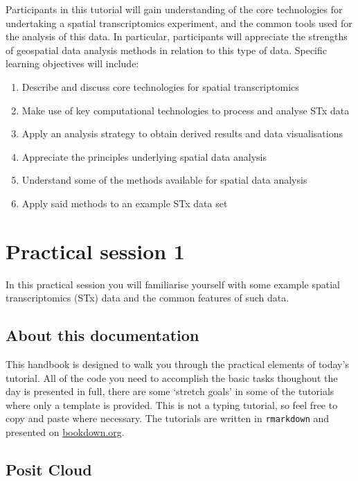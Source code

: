 \documentclass[
]{book}
\providecommand{\tightlist}{%
  \setlength{\itemsep}{0pt}\setlength{\parskip}{0pt}}
\begin{document}
Participants in this tutorial will gain understanding of the core technologies for undertaking a spatial transcriptomics experiment, and the common tools used for the analysis of this data. In particular, participants will appreciate the strengths of geospatial data analysis methods in relation to this type of data. Specific learning objectives will include:

\begin{enumerate}
\def\labelenumi{\arabic{enumi}.}
\tightlist
\item
  Describe and discuss core technologies for spatial transcriptomics
\item
  Make use of key computational technologies to process and analyse STx data
\item
  Apply an analysis strategy to obtain derived results and data visualisations
\item
  Appreciate the principles underlying spatial data analysis
\item
  Understand some of the methods available for spatial data analysis
\item
  Apply said methods to an example STx data set
\end{enumerate}

\hypertarget{practical-session-1}{%
\chapter{Practical session 1}\label{practical-session-1}}

In this practical session you will familiarise yourself with some example spatial transcriptomics (STx) data and the common features of such data.

\hypertarget{about-this-documentation}{%
\section{About this documentation}\label{about-this-documentation}}

This handbook is designed to walk you through the practical elements of today's tutorial. All of the code you need to accomplish the basic tasks thoughout the day is presented in full, there are some `stretch goals' in some of the tutorials where only a template is provided. This is not a typing tutorial, so feel free to copy and paste where necessary. The tutorials are written in \texttt{rmarkdown} and presented on \href{https://bookdown.org/}{bookdown.org}.

\hypertarget{posit-cloud}{%
\section{Posit Cloud}\label{posit-cloud}}
\end{document}
